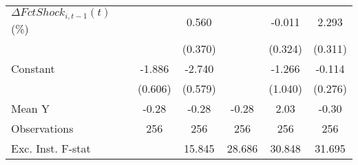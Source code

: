 {\begin{tabular}{l*{5}{c}}
\addlinespace
$ \Delta FctShock_{i,t-1}(t)$ (\%)&                     &       0.560         &                     &      -0.011         &       2.293\sym{***}\\
                    &                     &     (0.370)         &                     &     (0.324)         &     (0.311)         \\
\addlinespace
Constant            &      -1.886\sym{***}&      -2.740\sym{***}&                     &      -1.266         &      -0.114         \\
                    &     (0.606)         &     (0.579)         &                     &     (1.040)         &     (0.276)         \\
\midrule
Mean Y              &       -0.28         &       -0.28         &       -0.28         &        2.03         &       -0.30         \\
Observations        &         256         &         256         &         256         &         256         &         256         \\
Exc. Inst. F-stat   &                     &      15.845         &      28.686         &      30.848         &      31.695         \\
\bottomrule
\end{tabular}
}
